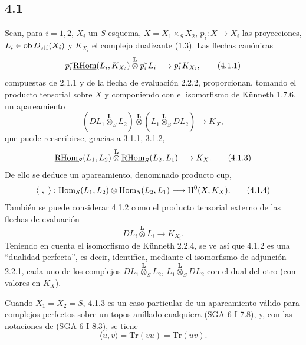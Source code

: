 \subsection*{4.1}
Sean, para $i=1,2$, $X_i$ un $S$-esquema, $X=X_1\times_SX_2$, $p_i:X\to X_i$ las proyecciones, $L_i\in\operatorname{ob}D_{\mathrm{ctf}}(X_i)$ y $K_{X_i}$ el complejo dualizante (1.3). Las flechas canónicas
\begin{equation}
p_i^*\underline{\mathrm{RHom}}(L_i,K_{X_i})\overset{\mathbf L}{\otimes}p_i^*L_i
\longrightarrow p_i^*K_{X_i},
\tag{4.1.1}
\end{equation}
compuestas de 2.1.1 y de la flecha de evaluación 2.2.2, proporcionan, tomando el producto tensorial sobre $X$ y componiendo con el isomorfismo de Künneth 1.7.6, un apareamiento
\begin{equation}
(DL_1\overset{\mathbf L}{\otimes}_S L_2)\overset{\mathbf L}{\otimes}(L_1\overset{\mathbf L}{\otimes}_S DL_2)
\longrightarrow K_X,
\tag{4.1.2}
\end{equation}
que puede reescribirse, gracias a 3.1.1, 3.1.2,
\begin{equation}
\underline{\mathrm{RHom}}_S(L_1,L_2)\overset{\mathbf L}{\otimes}\underline{\mathrm{RHom}}_S(L_2,L_1)
\longrightarrow K_X.
\tag{4.1.3}
\end{equation}
De ello se deduce un apareamiento, denominado producto cup,
\begin{equation}
\langle\ ,\ \rangle:\Hom_S(L_1,L_2)\otimes\Hom_S(L_2,L_1)
\longrightarrow \H^0(X,K_X).
\tag{4.1.4}
\end{equation}
También se puede considerar 4.1.2 como el producto tensorial externo de las flechas de evaluación
\[
DL_i\overset{\mathbf L}{\otimes}L_i\longrightarrow K_{X_i}.
\]
Teniendo en cuenta el isomorfismo de Künneth 2.2.4, se ve así que 4.1.2 es una ``dualidad perfecta'', es decir, identifica, mediante el isomorfismo de adjunción 2.2.1, cada uno de los complejos $DL_1\overset{\mathbf L}{\otimes}_S L_2$, $L_1\overset{\mathbf L}{\otimes}_S DL_2$ con el dual del otro (con valores en $K_X$).

Cuando $X_1=X_2=S$, 4.1.3 es un caso particular de un apareamiento válido para complejos perfectos sobre un topos anillado cualquiera (SGA 6 I 7.8), y, con las notaciones de (SGA 6 I 8.3), se tiene
\begin{equation}
\langle u,v\rangle=\mathrm{Tr}(vu)=\mathrm{Tr}(uv).
\tag{4.1.5}
\end{equation}


